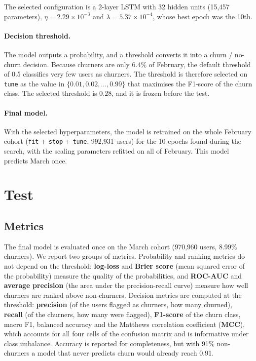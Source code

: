 \documentclass{article}
\begin{document}
The selected configuration is a 2-layer LSTM with 32 hidden units (15{,}457 parameters), $\eta = 2.29 \times 10^{-3}$ and $\lambda = 5.37 \times 10^{-4}$, whose best epoch was the 10th.

\paragraph{Decision threshold.} The model outputs a probability, and a threshold converts it into a churn / no-churn decision. Because churners are only 6.4\% of February, the default threshold of 0.5 classifies very few users as churners. The threshold is therefore selected on \texttt{tune} as the value in $\{0.01, 0.02, \dots, 0.99\}$ that maximises the F1-score of the churn class. The selected threshold is $0.28$, and it is frozen before the test.

\paragraph{Final model.} With the selected hyperparameters, the model is retrained on the whole February cohort (\texttt{fit} + \texttt{stop} + \texttt{tune}, 992{,}931 users) for the 10 epochs found during the search, with the scaling parameters refitted on all of February. This model predicts March once.

\section{Test}

\subsection{Metrics}

The final model is evaluated once on the March cohort (970{,}960 users, 8.99\% churners). We report two groups of metrics. Probability and ranking metrics do not depend on the threshold: \textbf{log-loss} and \textbf{Brier score} (mean squared error of the probability) measure the quality of the probabilities, and \textbf{ROC-AUC} and \textbf{average precision} (the area under the precision-recall curve) measure how well churners are ranked above non-churners. Decision metrics are computed at the threshold: \textbf{precision} (of the users flagged as churners, how many churned), \textbf{recall} (of the churners, how many were flagged), \textbf{F1-score} of the churn class, macro F1, balanced accuracy and the Matthews correlation coefficient (\textbf{MCC}), which accounts for all four cells of the confusion matrix and is informative under class imbalance. Accuracy is reported for completeness, but with 91\% non-churners a model that never predicts churn would already reach 0.91.
\end{document}
